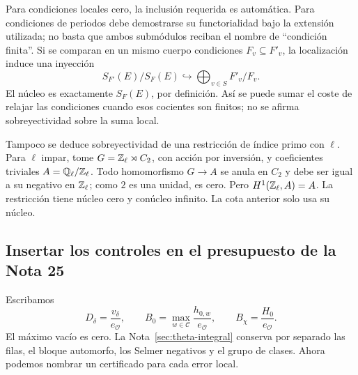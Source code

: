 Para condiciones locales cero, la inclusión requerida es
automática. Para condiciones de periodos debe demostrarse su
functorialidad bajo la extensión utilizada; no basta que ambos
submódulos reciban el nombre de ``condición finita''.
Si se comparan en un mismo cuerpo condiciones
$F_v\subseteq F'_v$, la localización induce una inyección
\begin{equation}
 S_{F'}(E)/S_F(E)\hookrightarrow\bigoplus_{v\in S}F'_v/F_v.
 \label{eq:lu-cambio-condicion}
\end{equation}
El núcleo es exactamente $S_F(E)$, por definición. Así se puede
sumar el coste de relajar las condiciones cuando esos cocientes
son finitos; no se afirma sobreyectividad sobre la suma local.

Tampoco se deduce sobreyectividad de una restricción de índice
primo con $\ell$. Para $\ell$ impar, tome
$G=\mathbb{Z}_\ell\rtimes C_2$, con acción por inversión, y coeficientes
triviales $A=\mathbb{Q}_\ell/\mathbb{Z}_\ell$. Todo homomorfismo $G\to A$
se anula en $C_2$ y debe ser igual a su negativo en $\mathbb{Z}_\ell$;
como $2$ es una unidad, es cero. Pero
$H^1(\mathbb{Z}_\ell,A)=A$. La restricción tiene núcleo cero y
conúcleo infinito. La cota anterior solo usa su núcleo.

\subsection{Insertar los controles en el presupuesto de la Nota 25}
\label{subsec:lu-presupuesto}

Escribamos
\[
 D_\delta=\frac{v_\delta}{e_{\mathcal O}},\qquad
 B_0=\max_{w\in\mathcal C}\frac{h_{0,w}}{e_{\mathcal O}},\qquad
 B_\chi=\frac{H_0}{e_{\mathcal O}}.
\]
El máximo vacío es cero. La Nota~\ref{sec:theta-integral}
conserva por separado las filas, el bloque automorfo, los Selmer
negativos y el grupo de clases. Ahora podemos nombrar un
certificado para cada error local.

